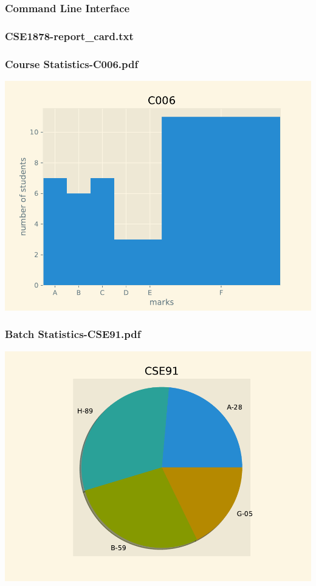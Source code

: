 \subsubsection*{Command Line Interface}
\subsubsection*{CSE1878-report\_card.txt}
\fontsize{12pt}{\baselineskip}\selectfont
{}
 \fontsize{14pt}{\baselineskip}\selectfont
\subsubsection*{Course Statistics-C006.pdf}
\includegraphics{outputs/Course Statistics-C006.pdf}
\subsubsection*{Batch Statistics-CSE91.pdf}
\includegraphics{outputs/Batch Statistics-CSE91.pdf}
